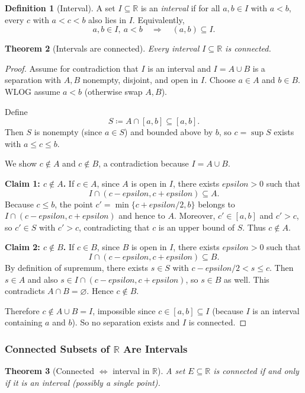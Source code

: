 \documentclass[12pt]{article}
\numberwithin{equation}{section}
\def\eps{epsilon}
\newcommand{\RR}{\mathbb{R}}
\let\emptyset\varnothing
\newcommand{\eps}{\varepsilon}               %
\theoremstyle{plain}
\newtheorem{theorem}{Theorem}[section]
\theoremstyle{definition}
\newtheorem{definition}[theorem]{Definition}
\theoremstyle{remark}
\begin{document}
\begin{definition}[Interval]
A set $I\subseteq\RR$ is an \emph{interval} if for all $a,b\in I$ with $a<b$, every $c$ with $a<c<b$ also lies in $I$.
Equivalently,
\[
a,b\in I,\ a<b \quad\Rightarrow\quad (a,b)\subseteq I.
\]
\end{definition}

\begin{theorem}[Intervals are connected]\label{thm:interval-connected}
Every interval $I\subseteq\RR$ is connected.
\end{theorem}

\begin{proof}
Assume for contradiction that $I$ is an interval and $I=A\cup B$ is a separation with $A,B$ nonempty, disjoint, and open in $I$.
Choose $a\in A$ and $b\in B$. WLOG assume $a<b$ (otherwise swap $A,B$).

Define
\[
S \coloneqq A\cap [a,b] \subseteq [a,b].
\]
Then $S$ is nonempty (since $a\in S$) and bounded above by $b$, so $c=\sup S$ exists with $a\le c\le b$.

We show $c\notin A$ and $c\notin B$, a contradiction because $I=A\cup B$.

\medskip
\noindent\textbf{Claim 1: $c\notin A$.}
If $c\in A$, since $A$ is open in $I$, there exists $\eps>0$ such that
\[
I\cap (c-\eps,c+\eps)\subseteq A.
\]
Because $c\le b$, the point $c'=\min\{c+\eps/2,b\}$ belongs to $I\cap (c-\eps,c+\eps)$ and hence to $A$.
Moreover, $c'\in [a,b]$ and $c'>c$, so $c'\in S$ with $c'>c$, contradicting that $c$ is an upper bound of $S$.
Thus $c\notin A$.

\medskip
\noindent\textbf{Claim 2: $c\notin B$.}
If $c\in B$, since $B$ is open in $I$, there exists $\eps>0$ such that
\[
I\cap (c-\eps,c+\eps)\subseteq B.
\]
By definition of supremum, there exists $s\in S$ with $c-\eps/2 < s \le c$.
Then $s\in A$ and also $s\in I\cap (c-\eps,c+\eps)$, so $s\in B$ as well.
This contradicts $A\cap B=\emptyset$. Hence $c\notin B$.

Therefore $c\notin A\cup B=I$, impossible since $c\in[a,b]\subseteq I$ (because $I$ is an interval containing $a$ and $b$).
So no separation exists and $I$ is connected.
\end{proof}

\subsubsection{Connected Subsets of $\RR$ Are Intervals}

\begin{theorem}[Connected $\Leftrightarrow$ interval in $\RR$]\label{thm:connected-interval}
A set $E\subseteq\RR$ is connected if and only if it is an interval (possibly a single point).
\end{theorem}
\end{document}
